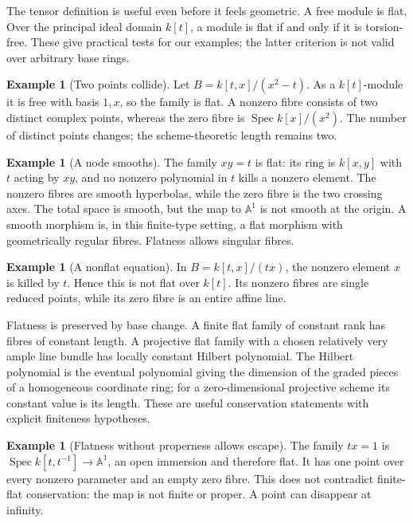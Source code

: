 \documentclass[11pt,a4paper]{article}
\numberwithin{equation}{section}
\theoremstyle{definition}
\newtheorem{example}[definition]{Example}
\newcommand{\A}{\mathbb A}
\newcommand{\Spec}{\operatorname{Spec}}
\begin{document}
The tensor definition is useful even before it feels geometric. A free
module is flat. Over the principal ideal domain $k[t]$, a module is flat
if and only if it is torsion-free. These give practical tests for our
examples; the latter criterion is not valid over arbitrary base rings.

\begin{example}[Two points collide]
Let $B=k[t,x]/(x^2-t)$. As a $k[t]$-module it is free with basis $1,x$,
so the family is flat. A nonzero fibre consists of two distinct complex
points, whereas the zero fibre is $\Spec k[x]/(x^2)$. The number of
distinct points changes; the scheme-theoretic length remains two.
\end{example}

\begin{example}[A node smooths]
The family $xy=t$ is flat: its ring is $k[x,y]$ with $t$ acting by $xy$,
and no nonzero polynomial in $t$ kills a nonzero element. The nonzero
fibres are smooth hyperbolas, while the zero fibre is the two crossing
axes. The total space is smooth, but the map to $\A^1$ is not smooth at
the origin. A smooth morphism is, in this finite-type setting, a flat
morphism with geometrically regular fibres. Flatness allows singular
fibres.
\end{example}

\begin{example}[A nonflat equation]
In $B=k[t,x]/(tx)$, the nonzero element $x$ is killed by $t$. Hence this
is not flat over $k[t]$. Its nonzero fibres are single reduced points,
while its zero fibre is an entire affine line.
\end{example}

Flatness is preserved by base change. A finite flat family of constant
rank has fibres of constant length. A projective flat family with a
chosen relatively very ample line bundle has locally constant Hilbert
polynomial. The Hilbert polynomial is the eventual polynomial giving
the dimension of the graded pieces of a homogeneous coordinate ring;
for a zero-dimensional projective scheme its constant value is its
length. These are useful conservation statements with explicit
finiteness hypotheses.

\begin{example}[Flatness without properness allows escape]
The family $tx=1$ is $\Spec k[t,t^{-1}]\to\A^1$, an open immersion and
therefore flat. It has one point over every nonzero parameter and an
empty zero fibre. This does not contradict finite-flat conservation:
the map is not finite or proper. A point can disappear at infinity.
\end{example}
\end{document}

